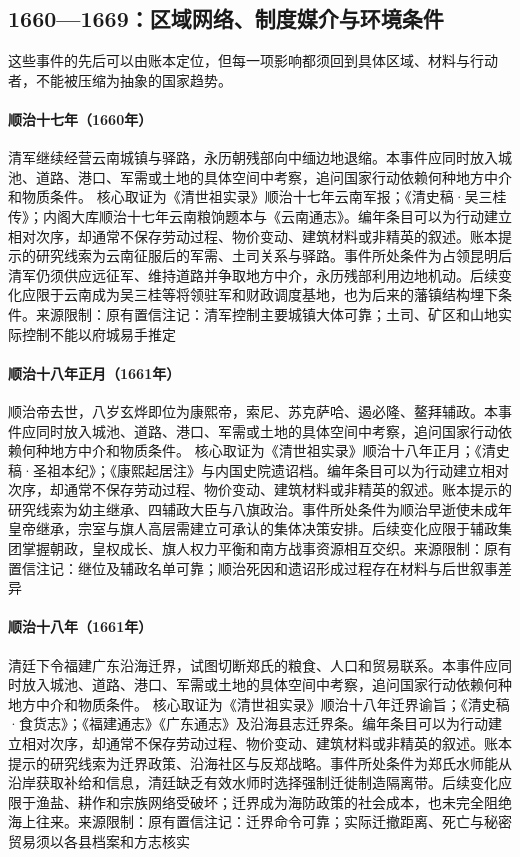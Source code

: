 \subsection{1660—1669：区域网络、制度媒介与环境条件}
这些事件的先后可以由账本定位，但每一项影响都须回到具体区域、材料与行动者，不能被压缩为抽象的国家趋势。
\hypertarget{civic:EQ-1660-QING-YUNNAN-CONSOLIDATION}{}\paragraph{顺治十七年（1660年）}清军继续经营云南城镇与驿路，永历朝残部向中缅边地退缩。本事件应同时放入城池、道路、港口、军需或土地的具体空间中考察，追问国家行动依赖何种地方中介和物质条件。 核心取证为《清世祖实录》顺治十七年云南军报；《清史稿·吴三桂传》；内阁大库顺治十七年云南粮饷题本与《云南通志》。编年条目可以为行动建立相对次序，却通常不保存劳动过程、物价变动、建筑材料或非精英的叙述。账本提示的研究线索为云南征服后的军需、土司关系与驿路。事件所处条件为占领昆明后清军仍须供应远征军、维持道路并争取地方中介，永历残部利用边地机动。后续变化应限于云南成为吴三桂等将领驻军和财政调度基地，也为后来的藩镇结构埋下条件。来源限制：原有置信注记：清军控制主要城镇大体可靠；土司、矿区和山地实际控制不能以府城易手推定
\hypertarget{civic:EQ-1661-KANGXI-ACCESSION}{}\paragraph{顺治十八年正月（1661年）}顺治帝去世，八岁玄烨即位为康熙帝，索尼、苏克萨哈、遏必隆、鳌拜辅政。本事件应同时放入城池、道路、港口、军需或土地的具体空间中考察，追问国家行动依赖何种地方中介和物质条件。 核心取证为《清世祖实录》顺治十八年正月；《清史稿·圣祖本纪》；《康熙起居注》与内国史院遗诏档。编年条目可以为行动建立相对次序，却通常不保存劳动过程、物价变动、建筑材料或非精英的叙述。账本提示的研究线索为幼主继承、四辅政大臣与八旗政治。事件所处条件为顺治早逝使未成年皇帝继承，宗室与旗人高层需建立可承认的集体决策安排。后续变化应限于辅政集团掌握朝政，皇权成长、旗人权力平衡和南方战事资源相互交织。来源限制：原有置信注记：继位及辅政名单可靠；顺治死因和遗诏形成过程存在材料与后世叙事差异
\hypertarget{civic:EQ-1661-COAST-EVACUATION}{}\paragraph{顺治十八年（1661年）}清廷下令福建广东沿海迁界，试图切断郑氏的粮食、人口和贸易联系。本事件应同时放入城池、道路、港口、军需或土地的具体空间中考察，追问国家行动依赖何种地方中介和物质条件。 核心取证为《清世祖实录》顺治十八年迁界谕旨；《清史稿·食货志》；《福建通志》《广东通志》及沿海县志迁界条。编年条目可以为行动建立相对次序，却通常不保存劳动过程、物价变动、建筑材料或非精英的叙述。账本提示的研究线索为迁界政策、沿海社区与反郑战略。事件所处条件为郑氏水师能从沿岸获取补给和信息，清廷缺乏有效水师时选择强制迁徙制造隔离带。后续变化应限于渔盐、耕作和宗族网络受破坏；迁界成为海防政策的社会成本，也未完全阻绝海上往来。来源限制：原有置信注记：迁界命令可靠；实际迁撤距离、死亡与秘密贸易须以各县档案和方志核实
